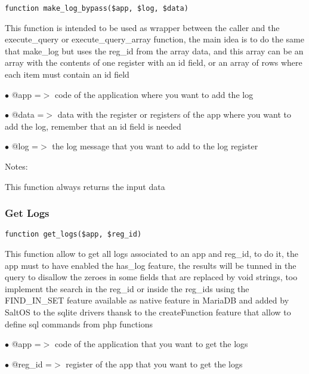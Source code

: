 \documentclass[a4paper]{article}
\begin{document}
\begin{lstlisting}
function make_log_bypass($app, $log, $data)
\end{lstlisting}

This function is intended to be used as wrapper between the caller and the
execute\_query or execute\_query\_array function, the main idea is to do the
same that make\_log but uses the reg\_id from the array data, and this array
can be an array with the contents of one register with an id field, or an
array of rows where each item must contain an id field

\begin{compactitem}
\item[\color{myblue}$\bullet$] @app  =$>$ code of the application where you want to add the log
\item[\color{myblue}$\bullet$] @data =$>$ data with the register or registers of the app where you want to
         add the log, remember that an id field is needed
\item[\color{myblue}$\bullet$] @log  =$>$ the log message that you want to add to the log register
\end{compactitem}

Notes:

This function always returns the input data

\hypertarget{toc491}{}
\subsubsection{Get Logs}

\begin{lstlisting}
function get_logs($app, $reg_id)
\end{lstlisting}

This function allow to get all logs associated to an app and reg\_id, to do it,
the app must to have enabled the has\_log feature, the results will be tunned
in the query to disallow the zeroes in some fields that are replaced by void
strings, too implement the search in the reg\_id or inside the reg\_ids using
the FIND\_IN\_SET feature available as native feature in MariaDB and added by
SaltOS to the sqlite drivers thansk to the createFunction feature that allow
to define sql commands from php functions

\begin{compactitem}
\item[\color{myblue}$\bullet$] @app    =$>$ code of the application that you want to get the logs
\item[\color{myblue}$\bullet$] @reg\_id =$>$ register of the app that you want to get the logs
\end{compactitem}
\end{document}
